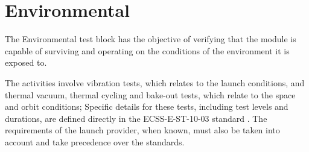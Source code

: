 \section{Environmental}

The Environmental test block has the objective of verifying that the module is capable of surviving and operating on the conditions of the environment it is exposed to.

The activities involve vibration tests, which relates to the launch conditions, and thermal vacuum, thermal cycling and bake-out tests, which relate to the space and orbit conditions;
Specific details for these tests, including test levels and durations, are defined directly in the ECSS-E-ST-10-03 standard \cite{ecss-e-st-10-03}. The requirements of the launch provider, when known, must also be taken into account and take precedence over the standards.
